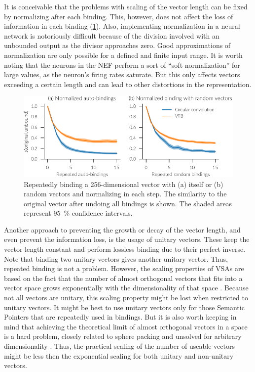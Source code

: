 It is conceivable that the problems with scaling of the vector length can be fixed by normalizing after each binding.
This, however, does not affect the loss of information in each binding (\cref{fig:bindings-normalized}).
Also, implementing normalization in a neural network is notoriously difficult because of the division involved with an unbounded output as the divisor approaches zero.
Good approximations of normalization are only possible for a defined and finite input range.
It is worth noting that the neurons in the NEF perform a sort of ``soft normalization'' for large values, as the neuron's firing rates saturate.
But this only affects vectors exceeding a certain length and can lead to other distortions in the representation.
\begin{figure}
    \centering
    \includegraphics{figures/bindings-normalized}
    \caption[Repeatedly binding a 256-dimensional vector with normalization.]{Repeatedly binding a 256-dimensional vector with (a) itself or (b) random vectors and normalizing in each step. The similarity to the original vector after undoing all bindings is shown. The shaded areas represent \SI{95}{\percent} confidence intervals.}\label{fig:bindings-normalized}
\end{figure}

Another approach to preventing the growth or decay of the vector length, and even prevent the information loss, is the usage of unitary vectors.
These keep the vector length constant and perform lossless binding due to their perfect inverse.
Note that binding two unitary vectors gives another unitary vector.
Thus, repeated binding is not a problem.
However, the scaling properties of VSAs are based on the fact that the number of almost orthogonal vectors that fits into a vector space grows exponentially with the dimensionality of that space \parencite{wyner1967,cai2013}.
Because not all vectors are unitary, this scaling property might be lost when restricted to unitary vectors.
It might be best to use unitary vectors only for those Semantic Pointers that are repeatedly used in bindings.
But it is also worth keeping in mind that achieving the theoretical limit of almost orthogonal vectors in a space is a hard problem, closely related to sphere packing and unsolved for arbitrary dimensionality \parencite{cohn2017}.
Thus, the practical scaling of the number of useable vectors might be less then the exponential scaling for both unitary and non-unitary vectors.

